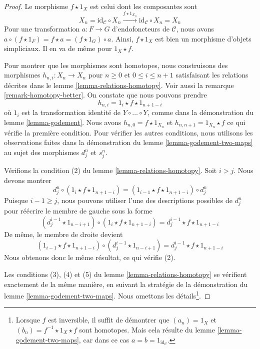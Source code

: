 \begin{proof}
Le morphisme $f \star 1_X$ est celui dont les composantes sont
$$
X_n = \text{id}_\mathcal{C} \circ X_n
\xrightarrow{f \star 1_{X_n}}
\text{id}_\mathcal{C} \circ X_n = X_n
$$
Pour une transformation $a : F \to G$ d'endofoncteurs de $\mathcal{C}$, nous
avons $a \circ (f \star 1_F) = f \star a = (f \star 1_G) \circ a$. Ainsi,
$f \star 1_X$ est bien un morphisme d'objets simpliciaux. Il en va de même
pour $1_X \star f$.

\medskip\noindent
Pour montrer que les morphismes sont homotopes, nous construisons des
morphismes $h_{n, i} : X_n \to X_n$ pour $n \geq 0$ et $0 \leq i \leq n + 1$
satisfaisant les relations décrites dans le lemme
\ref{lemma-relations-homotopy}. Voir aussi la remarque
\ref{remark-homotopy-better}. On constate que nous pouvons prendre
$$
h_{n, i} = 1_i \star f \star 1_{n + 1 - i}
$$
où $1_i$ est la transformation identité de $Y \circ \ldots \circ Y$, comme
dans la démonstration du lemme \ref{lemma-godement}. Nous avons
$h_{n, 0} = f \star 1_{X_n}$ et $h_{n, n + 1} = 1_{X_n} \star f$
ce qui vérifie la première condition. Pour vérifier les autres conditions,
nous utilisons les observations faites dans la démonstration du lemme
\ref{lemma-godement-two-maps} au sujet des morphismes $d^n_j$ et $s^n_j$.

\medskip\noindent
Vérifions la condition (2) du lemme \ref{lemma-relations-homotopy}.
Soit $i > j$. Nous devons montrer
$$
d^n_j \circ (1_i \star f \star 1_{n + 1 - i}) =
(1_{i - 1} \star f \star 1_{n + 1 - i}) \circ d^n_j
$$
Puisque $i - 1 \geq j$, nous pouvons utiliser l'une des descriptions possibles
de $d^n_j$ pour réécrire le membre de gauche sous la forme
$$
(d^{i - 1}_j \star 1_{n - i + 1}) \circ (1_i \star f \star 1_{n + 1 - i}) =
d^{i - 1}_j \star f \star 1_{n + 1 - i}
$$
De même, le membre de droite devient
$$
(1_{i - 1} \star f \star 1_{n + 1 - i}) \circ
(d^{i - 1}_j \star 1_{n - i + 1}) =
d^{i - 1}_j \star f \star 1_{n + 1 - i}
$$
Nous obtenons donc le même résultat, ce qui vérifie (2).

\medskip\noindent
Les conditions (3), (4) et (5) du lemme \ref{lemma-relations-homotopy}
se vérifient exactement de la même manière, en suivant la stratégie de la
démonstration du lemme \ref{lemma-godement-two-maps}. Nous omettons les
détails\footnote{Lorsque $f$ est inversible, il suffit de démontrer que
$(a_n) = 1_X$ et $(b_n) = f^{-1} \star 1_X \star f$ sont homotopes.
Mais cela résulte du lemme \ref{lemma-godement-two-maps}, car dans ce cas
$a = b = 1_{\text{id}_\mathcal{C}}$.}.
\end{proof}

